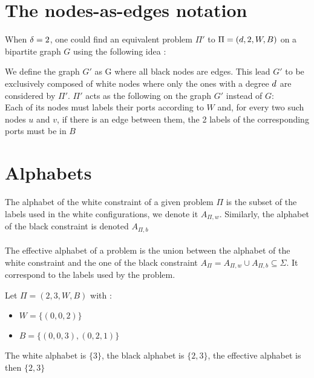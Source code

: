 \section{The nodes-as-edges notation}
When $\delta = 2$, one could find an equivalent problem $\Pi'$ to $\Pi = (d,2,W,B)$ on a bipartite graph $G$ using the following idea \cite{1}:

We define the graph $G'$ as G where all black nodes are edges. This lead $G'$ to be exclusively composed of white nodes where only the ones with a degree $d$ are considered by $\Pi'$.
$\Pi'$ acts as the following on the graph $G'$ instead of $G$:\\
Each of its nodes must labels their ports according to $W$ and, for every two such nodes $u$ and $v$, if there is an edge between them, the 2 labels of the corresponding ports must be in $B$\\

\section{Alphabets}
The alphabet of the white constraint of a given problem $\Pi$ is the subset of the labels used in the white configurations, we denote it $A_{\Pi,w}$. Similarly, the alphabet of the black constraint is denoted $A_{\Pi,b}$\\\\
The effective alphabet of a problem is the union between the alphabet of the white constraint and the one of the black constraint $A_{\Pi} = A_{\Pi,w} \cup A_{\Pi,b} \subseteq \Sigma$. It correspond to the labels used by the problem.
\begin{exmp}
Let $\Pi = (2,3,W,B)$ with :
\begin{itemize}
    \item $W = \{(0,0,2)\}$
    \item $B = \{(0,0,3),(0,2,1)\}$
\end{itemize}
The white alphabet is $\{3\}$, the black alphabet is $\{2,3\}$, the effective alphabet is then $\{2,3\}$
\end{exmp}
